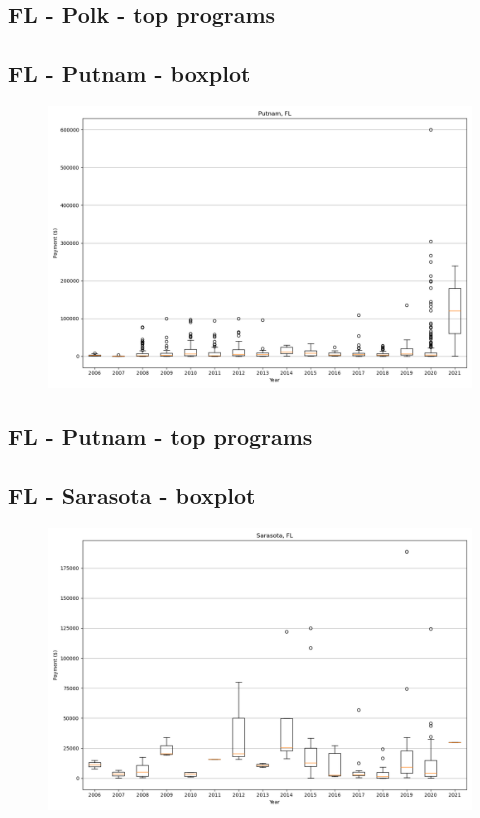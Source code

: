 \subsection*{FL - Polk - top programs}

\newpage
\subsection*{FL - Putnam - boxplot}
\begin{figure}[h]
\centering
\includegraphics[width=7in]{../output/boxplots/counties/Putnam-FL_boxplot.png}
\end{figure}


\subsection*{FL - Putnam - top programs}

\newpage
\subsection*{FL - Sarasota - boxplot}
\begin{figure}[h]
\centering
\includegraphics[width=7in]{../output/boxplots/counties/Sarasota-FL_boxplot.png}
\end{figure}


